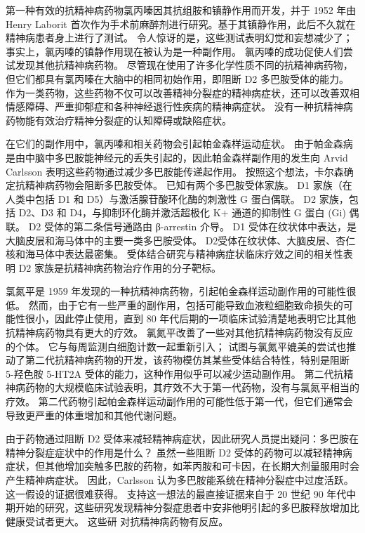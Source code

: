 第一种有效的抗精神病药物氯丙嗪因其抗组胺和镇静作用而开发，并于 1952 年由 Henry Laborit 首次作为手术前麻醉剂进行研究。基于其镇静作用，此后不久就在精神病患者身上进行了测试。 令人惊讶的是，这些测试表明幻觉和妄想减少了； 事实上，氯丙嗪的镇静作用现在被认为是一种副作用。 氯丙嗪的成功促使人们尝试发现其他抗精神病药物。 尽管现在使用了许多化学性质不同的抗精神病药物，但它们都具有氯丙嗪在大脑中的相同初始作用，即阻断 D2 多巴胺受体的能力。 作为一类药物，这些药物不仅可以改善精神分裂症的精神病症状，还可以改善双相情感障碍、严重抑郁症和各种神经退行性疾病的精神病症状。 没有一种抗精神病药物能有效治疗精神分裂症的认知障碍或缺陷症状。

在它们的副作用中，氯丙嗪和相关药物会引起帕金森样运动症状。 由于帕金森病是由中脑中多巴胺能神经元的丢失引起的，因此帕金森样副作用的发生向 Arvid Carlsson 表明这些药物通过减少多巴胺能传递起作用。 按照这个想法，卡尔森确定抗精神病药物会阻断多巴胺受体。 已知有两个多巴胺受体家族。 D1 家族（在人类中包括 D1 和 D5）与激活腺苷酸环化酶的刺激性 G 蛋白偶联。 D2 家族，包括 D2、D3 和 D4，与抑制环化酶并激活超极化 K+ 通道的抑制性 G 蛋白 (Gi) 偶联。 D2 受体的第二条信号通路由 β-arrestin 介导。 D1 受体在纹状体中表达，是大脑皮层和海马体中的主要一类多巴胺受体。 D2受体在纹状体、大脑皮层、杏仁核和海马体中表达最密集。 受体结合研究与精神病症状临床疗效之间的相关性表明 D2 家族是抗精神病药物治疗作用的分子靶标。

氯氮平是 1959 年发现的一种抗精神病药物，引起帕金森样运动副作用的可能性很低。 然而，由于它有一些严重的副作用，包括可能导致血液粒细胞致命损失的可能性很小，因此停止使用，直到 80 年代后期的一项临床试验清楚地表明它比其他抗精神病药物具有更大的疗效。 氯氮平改善了一些对其他抗精神病药物没有反应的个体。 它与每周监测白细胞计数一起重新引入； 试图与氯氮平媲美的尝试也推动了第二代抗精神病药物的开发，该药物模仿其某些受体结合特性，特别是阻断 5-羟色胺 5-HT2A 受体的能力，这种作用似乎可以减少运动副作用。 第二代抗精神病药物的大规模临床试验表明，其疗效不大于第一代药物，没有与氯氮平相当的疗效。 第二代药物引起帕金森样运动副作用的可能性低于第一代，但它们通常会导致更严重的体重增加和其他代谢问题。

由于药物通过阻断 D2 受体来减轻精神病症状，因此研究人员提出疑问：多巴胺在精神分裂症症状中的作用是什么？ 虽然一些阻断 D2 受体的药物可以减轻精神病症状，但其他增加突触多巴胺的药物，如苯丙胺和可卡因，在长期大剂量服用时会产生精神病症状。 因此，Carlsson 认为多巴胺能系统在精神分裂症中过度活跃。 这一假设的证据很难获得。 支持这一想法的最直接证据来自于 20 世纪 90 年代中期开始的研究，这些研究发现精神分裂症患者中安非他明引起的多巴胺释放增加比健康受试者更大。 这些研 对抗精神病药物有反应。

